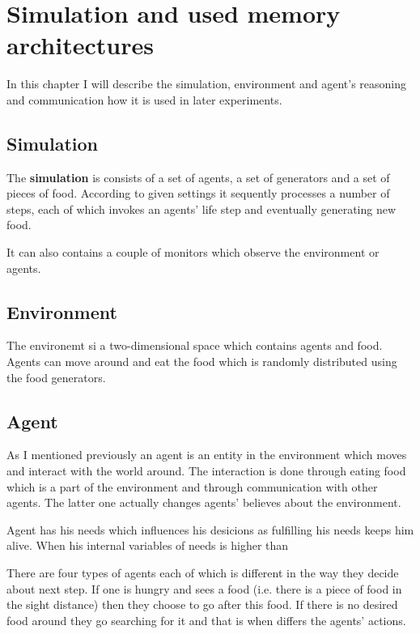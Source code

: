 \chapter{Simulation and used memory architectures}

In this chapter I will describe the simulation, environment and agent's reasoning and communication how it is used in later experiments. 

\section{Simulation}

The {\bf simulation} is consists of a set of agents, a set of generators and a set of pieces of food. According to given settings it sequently processes a number of steps, each of which invokes an agents' life step and eventually generating new food.

It can also contains a couple of monitors which observe the environment or agents.

\section{Environment}

The environemt si a two-dimensional space which contains agents and food. Agents can move around and eat the food which is randomly distributed using the food generators. 

\section{Agent}                                                      

As I mentioned previously an agent is an entity in the environment which moves and interact with the world around. The interaction is done through eating food which is a part of the environment and through communication with other agents. The latter one actually changes agents' believes about the environment.

Agent has his needs which influences his desicions as fulfilling his needs keeps him alive. When his internal variables of needs is higher than    

There are four types of agents each of which is different in the way they decide about next step. If one is hungry and sees a food (i.e. there is a piece of food in the sight distance) then they choose to go after this food. If there is no desired food around they go searching for it and that is when differs the agents' actions.

